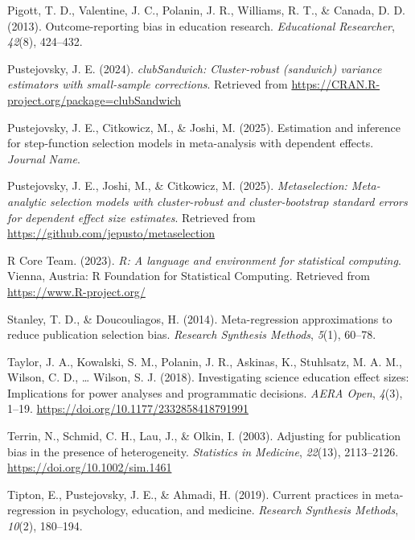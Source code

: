 \documentclass[
  american,
  man, donotrepeattitle,floatsintext]{apa7}
\newlength{\cslhangindent}
\newenvironment{CSLReferences}[2] %
 {\begin{list}{}{%
  \setlength{\itemindent}{0pt}
  \setlength{\leftmargin}{0pt}
  \setlength{\parsep}{0pt}
  \ifodd #1
   \setlength{\leftmargin}{\cslhangindent}
   \setlength{\itemindent}{-1\cslhangindent}
  \fi
  \setlength{\itemsep}{#2\baselineskip}}}
 {\end{list}}
\begin{document}
\begin{CSLReferences}{1}{0}
Pigott, T. D., Valentine, J. C., Polanin, J. R., Williams, R. T., \& Canada, D. D. (2013). Outcome-reporting bias in education research. \emph{Educational Researcher}, \emph{42}(8), 424--432.

Pustejovsky, J. E. (2024). \emph{clubSandwich: Cluster-robust (sandwich) variance estimators with small-sample corrections}. Retrieved from \url{https://CRAN.R-project.org/package=clubSandwich}

Pustejovsky, J. E., Citkowicz, M., \& Joshi, M. (2025). Estimation and inference for step-function selection models in meta-analysis with dependent effects. \emph{Journal Name}.

Pustejovsky, J. E., Joshi, M., \& Citkowicz, M. (2025). \emph{Metaselection: Meta-analytic selection models with cluster-robust and cluster-bootstrap standard errors for dependent effect size estimates}. Retrieved from \url{https://github.com/jepusto/metaselection}

R Core Team. (2023). \emph{R: A language and environment for statistical computing}. Vienna, Austria: R Foundation for Statistical Computing. Retrieved from \url{https://www.R-project.org/}

Stanley, T. D., \& Doucouliagos, H. (2014). Meta-regression approximations to reduce publication selection bias. \emph{Research Synthesis Methods}, \emph{5}(1), 60--78.

Taylor, J. A., Kowalski, S. M., Polanin, J. R., Askinas, K., Stuhlsatz, M. A. M., Wilson, C. D., \ldots{} Wilson, S. J. (2018). Investigating science education effect sizes: Implications for power analyses and programmatic decisions. \emph{AERA Open}, \emph{4}(3), 1--19. \url{https://doi.org/10.1177/2332858418791991}

Terrin, N., Schmid, C. H., Lau, J., \& Olkin, I. (2003). Adjusting for publication bias in the presence of heterogeneity. \emph{Statistics in Medicine}, \emph{22}(13), 2113--2126. \url{https://doi.org/10.1002/sim.1461}

Tipton, E., Pustejovsky, J. E., \& Ahmadi, H. (2019). Current practices in meta-regression in psychology, education, and medicine. \emph{Research Synthesis Methods}, \emph{10}(2), 180--194.


\end{CSLReferences}
\end{document}
